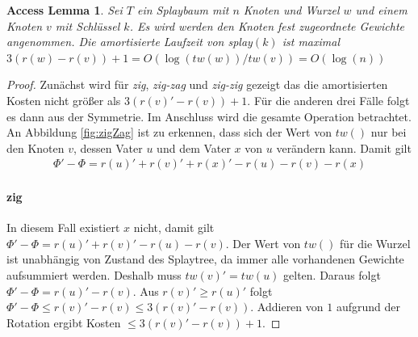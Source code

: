 \documentclass[a4paper,12pt]{article}
\begin{document}
\newtheorem{Lemma1}{Access Lemma}[section] \label{lemmaSplay}
\begin{Lemma1}Sei $T$ ein Splaybaum mit $n$ Knoten und Wurzel $w$ und einem Knoten $v$ mit Schlüssel $k$. Es wird werden den Knoten fest zugeordnete Gewichte angenommen. Die amortisierte Laufzeit von \textit{splay}$\left(k\right)$ ist maximal $3 \left(r\left(w\right) - r\left(v\right)\right) + 1 = O\left(\log\left(\mathit{tw}\left(w\right)\right)  / \mathit{tw}\left(v\right) \right) = O\left(\log\left(n\right)\right)$ \\

\end{Lemma1}
\begin{proof}
Zunächst wird für \textit{zig}, \textit{zig-zag} und \textit{zig-zig} gezeigt das die amortisierten Kosten nicht größer als $3 \left(r\left(v\right)' - r\left(v\right)\right) + 1$. Für die anderen drei Fälle folgt es dann aus der Symmetrie. Im Anschluss wird die gesamte Operation  betrachtet. An Abbildung  \ref{fig:zigZag} ist zu erkennen, dass sich der Wert von $\mathit{tw}\left(\right)$ nur bei den Knoten $v$, dessen Vater $u$  und dem Vater $x$ von $u$ verändern kann.  Damit gilt
\begin{align*}
\Phi' - \Phi  = r\left(u\right)' +r\left(v\right)' +r\left(x\right)' - r\left(u\right)- r\left(v\right)- r\left(x\right)
\end{align*}


\paragraph{zig} 
In diesem Fall existiert $x$ nicht, damit gilt\\  {$ \Phi' - \Phi  = r\left(u\right)' +r\left(v\right)' - r\left(u\right)- r\left(v\right)$}. Der Wert von $\mathit{tw}\left(\right)$ für die Wurzel ist unabhängig von Zustand des Splaytree, da immer alle vorhandenen Gewichte aufsummiert werden. Deshalb muss  $\mathit{tw}\left(v\right)' =  \mathit{tw}\left(u\right)$ gelten. Daraus folgt $ \Phi' - \Phi  = r\left(u\right)'- r\left(v\right)$. Aus $r\left(v\right)' \geq r\left(u\right)'$ folgt $ \Phi' - \Phi \leq  r\left(v\right)'- r\left(v\right) \leq 3\left(r\left(v\right)'- r\left(v\right)\right) $. Addieren von $1$ aufgrund der Rotation ergibt Kosten $\leq 3\left(r\left(v\right)'- r\left(v\right)\right) + 1$.

\end{proof}
\end{document}
